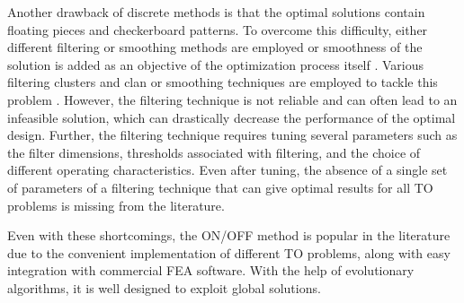 Another drawback of discrete methods is that the optimal solutions contain floating pieces and checkerboard patterns. To overcome this difficulty, either different filtering or smoothing methods are employed \parencite{campelo2008topology} or smoothness of the solution is added as an objective of the optimization process itself \parencite{dupre2014ant}. Various filtering clusters and clan or smoothing techniques are employed to tackle this problem \parencite{campelo2010survey,campelo2008,sato2014}. However, the filtering technique is not reliable and can often lead to an infeasible solution, which can drastically decrease the performance of the optimal design. Further, the filtering technique requires tuning several parameters such as the filter dimensions, thresholds associated with filtering, and the choice of different operating characteristics. Even after tuning, the absence of a single set of parameters of a filtering technique that can give optimal results for all TO problems is missing from the literature.

Even with these shortcomings, the ON/OFF method is popular in the literature due to the convenient implementation of different TO problems, along with easy integration with commercial FEA software. With the help of evolutionary algorithms, it is well designed to exploit global solutions.


